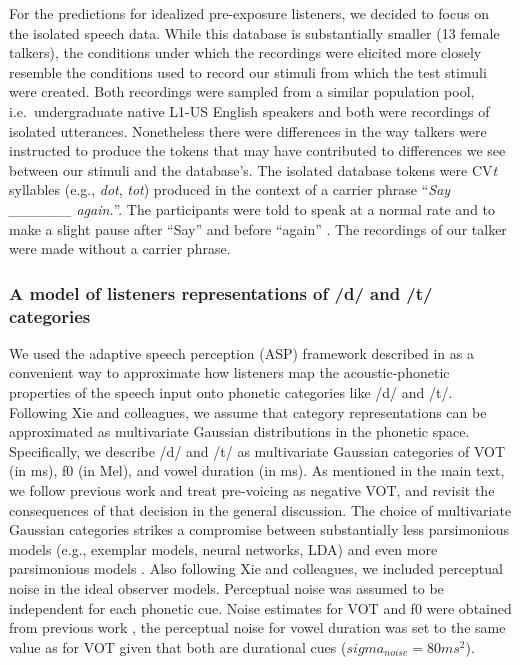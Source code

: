\documentclass[
  11pt,
  man,mask,floatsintext]{apa6}
\begin{document}
For the predictions for idealized pre-exposure listeners, we decided to focus on the isolated speech data. While this database is substantially smaller (13 female talkers), the conditions under which the recordings were elicited more closely resemble the conditions used to record our stimuli from which the test stimuli were created. Both recordings were sampled from a similar population pool, i.e.~undergraduate native L1-US English speakers and both were recordings of isolated utterances. Nonetheless there were differences in the way talkers were instructed to produce the tokens that may have contributed to differences we see between our stimuli and the database's. The isolated database tokens were CV\emph{t} syllables (e.g., \emph{dot}, \emph{tot}) produced in the context of a carrier phrase ``\emph{Say \_\_\_\_\_\_ again.}''. The participants were told to speak at a normal rate and to make a slight pause after ``Say'' and before ``again'' \autocite{chodroff-wilson2014}. The recordings of our talker were made without a carrier phrase.

\subsubsection{A model of listeners representations of /d/ and /t/ categories}\label{a-model-of-listeners-representations-of-d-and-t-categories}

We used the adaptive speech perception (ASP) framework described in \textcite{xie2023} as a convenient way to approximate how listeners map the acoustic-phonetic properties of the speech input onto phonetic categories like /d/ and /t/. Following Xie and colleagues, we assume that category representations can be approximated as multivariate Gaussian distributions in the phonetic space. Specifically, we describe /d/ and /t/ as multivariate Gaussian categories of VOT (in ms), f0 (in Mel), and vowel duration (in ms). As mentioned in the main text, we follow previous work and treat pre-voicing as negative VOT, and revisit the consequences of that decision in the general discussion. The choice of multivariate Gaussian categories strikes a compromise between substantially less parsimonious models (e.g., exemplar models, neural networks, LDA) and even more parsimonious models \autocite[e.g., independent Gaussians for each phonetic cue, as discussed in more detail in][]{xie2023}. Also following Xie and colleagues, we included perceptual noise in the ideal observer models. Perceptual noise was assumed to be independent for each phonetic cue. Noise estimates for VOT and f0 were obtained from previous work \autocite[\(sigma_{noise} = 80ms^2\) and \(878 Mel^2\), respectively]{kronrod2016}, the perceptual noise for vowel duration was set to the same value as for VOT given that both are durational cues (\(sigma_{noise} = 80ms^2\)).
\end{document}

